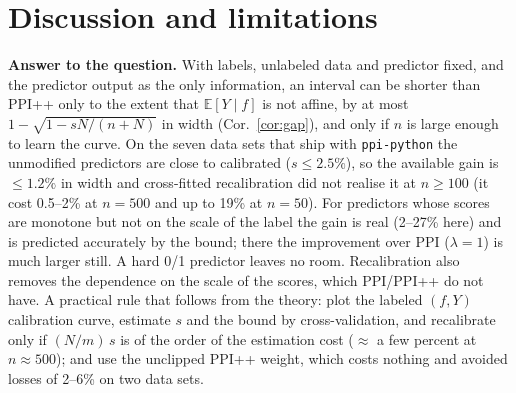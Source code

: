 \section{Discussion and limitations}\label{sec:disc}
\textbf{Answer to the question.} With labels, unlabeled data and predictor fixed, and the predictor output as the only information, an interval can be shorter than PPI++ only to the extent that $\mathbb E[Y\mid f]$ is not affine, by at most $1-\sqrt{1-sN/(n+N)}$ in width (Cor.~\ref{cor:gap}), and only if $n$ is large enough to learn the curve. On the seven data sets that ship with \texttt{ppi-python} the unmodified predictors are close to calibrated ($s\le2.5\%$), so the available gain is $\le1.2\%$ in width and cross-fitted recalibration did not realise it at $n\ge100$ (it cost 0.5--2\% at $n=500$ and up to 19\% at $n=50$). For predictors whose scores are monotone but not on the scale of the label the gain is real (2--27\% here) and is predicted accurately by the bound; there the improvement over PPI ($\lambda=1$) is much larger still. A hard 0/1 predictor leaves no room. Recalibration also removes the dependence on the scale of the scores, which PPI/PPI++ do not have. A practical rule that follows from the theory: plot the labeled $(f,Y)$ calibration curve, estimate $s$ and the bound by cross-validation, and recalibrate only if $(N/m)\,s$ is of the order of the estimation cost ($\approx$ a few percent at $n\approx500$); and use the unclipped PPI++ weight, which costs nothing and avoided losses of 2--6\% on two data sets.

